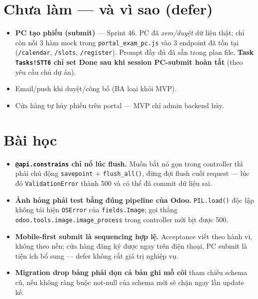 \section{Chưa làm --- và vì sao (defer)}

\begin{itemize}
  \item \textbf{PC tạo phiếu (submit)} --- Sprint 46. PC đã \emph{xem/duyệt} dữ liệu thật;
    chỉ còn nối 3 hàm mock trong \texttt{portal\_exam\_pc.js} vào 3 endpoint đã tồn tại
    (\texttt{/calendar}, \texttt{/slots}, \texttt{/register}). Prompt đầy đủ đã sẵn trong
    plan file. \textbf{Task \texttt{Tasks!STT6} chỉ set Done sau khi session PC-submit
    hoàn tất} (theo yêu cầu chủ dự án).
  \item Email/push khi duyệt/công bố (BA loại khỏi MVP).
  \item Cửa hàng tự hủy phiếu trên portal --- MVP chỉ admin backend hủy.
\end{itemize}

\section{Bài học}

\begin{itemize}
  \item \textbf{\texttt{@api.constrains} chỉ nổ lúc flush.} Muốn bắt nó gọn trong
    controller thì phải chủ động \texttt{savepoint} $+$ \texttt{flush\_all()}, đừng đợi
    flush cuối request --- lúc đó \texttt{ValidationError} thành 500 và có thể đã commit
    dữ liệu sai.
  \item \textbf{Ảnh hỏng phải test bằng đúng pipeline của Odoo.} \texttt{PIL.load()} độc
    lập không tái hiện \texttt{OSError} của \texttt{fields.Image}; gọi thẳng
    \texttt{odoo.tools.image.image\_process} trong controller mới bịt được 500.
  \item \textbf{Mobile-first submit là sequencing hợp lệ.} Acceptance viết theo hành vi,
    không theo nền; cửa hàng đăng ký được ngay trên điện thoại, PC submit là tiện ích bổ
    sung --- defer không cắt giá trị nghiệp vụ.
  \item \textbf{Migration drop bảng phải dọn cả bản ghi mồ côi} tham chiếu schema cũ, nếu
    không ràng buộc not-null của schema mới sẽ chặn ngay lần update kế.
\end{itemize}
